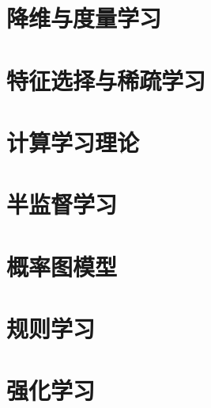 \documentclass{ctexart}
\begin{document}
			\section{降维与度量学习}
			\section{特征选择与稀疏学习}
			\section{计算学习理论}
			\section{半监督学习}
			\section{概率图模型}
			\section{规则学习}
			\section{强化学习}
			
\end{document}
